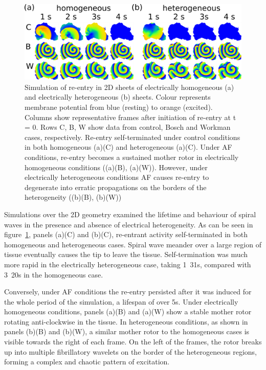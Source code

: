\begin{figure}
\centering
\includegraphics{figures/toolkit/afer/2d_plots}
\caption[AFER 2D re-entry plots]{
\label{fig:toolkit:afer:2d}
Simulation of re-entry in 2D sheets of electrically homogeneous
(a) and electrically heterogeneous (b) sheets.
Colour represents membrane potential from blue (resting) to orange (excited).
Columns show representative frames after initiation of re-entry at t = 0.
Rows C, B, W show data from control, Bosch and Workman cases, respectively.
Re-entry self-terminated under control conditions in both homogeneous (a)(C) and
heterogeneous (a)(C).
Under AF conditions, re-entry becomes a sustained mother rotor in
electrically homogeneous conditions ((a)(B), (a)(W)).
However, under electrically heterogeneous conditions AF causes re-entry to degenerate
into erratic propagations on the borders of the heterogeneity ((b)(B), (b)(W)) }
\end{figure}

Simulations over the 2D geometry examined the lifetime and behaviour of
spiral waves in the presence and absence of electrical heterogeneity.
As can be seen in figure~\ref{fig:toolkit:afer:2d}, panels (a)(C) and (b)(C), re-entrant
activity self-terminated in both homogeneous and heterogeneous cases.
Spiral wave meander over a large region of tissue eventually causes the tip to
leave the tissue.
Self-termination was much more rapid in the electrically heterogeneous case,
taking \unit{1.31}{s}, compared with \unit{3.20}{s} in the homogeneous case.

Conversely, under AF conditions the re-entry persisted after it was
induced for the whole period of the simulation, a lifespan of over \unit{5}{s}.
Under electrically homogeneous conditions, panels (a)(B) and (a)(W) show a
stable mother rotor rotating anti-clockwise in the tissue.
In heterogeneous conditions, as shown in panels (b)(B) and (b)(W), a similar
mother rotor to the homogeneous cases is visible towards the right of each
frame.
On the left of the frames, the rotor breaks up into multiple fibrillatory
wavelets on the border of the heterogeneous regions, forming a complex and
chaotic pattern of excitation.


